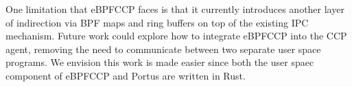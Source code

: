 \documentclass[../main.tex]{subfiles}
\begin{document}
One limitation that eBPFCCP faces is that it currently introduces another layer of indirection via BPF maps and ring buffers on top of the existing IPC mechanism. Future work could explore how to integrate eBPFCCP into the CCP agent, removing the need to communicate between two separate user space programs. We envision this work is made easier since both the user spaec component of eBPFCCP and Portus are written in Rust.
\end{document}
